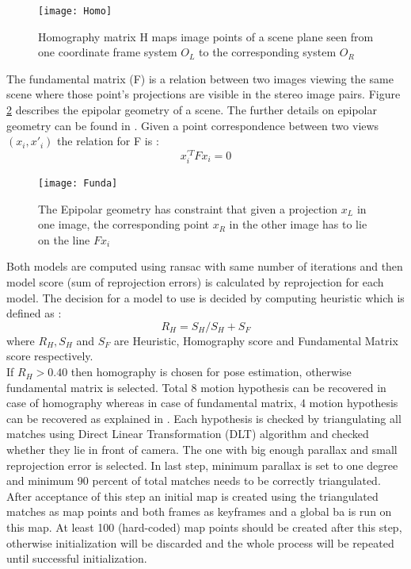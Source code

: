 \newline
\begin{figure}[H]
	\centering
	\texttt{[image: Homo]}
	\caption{Homography matrix H maps image points of a scene plane seen from one coordinate frame system $ O_{L} $ to the corresponding system $ O_{R} $ \cite{multiview}}
	\label{fig:h}
\end{figure}
\noindent The fundamental matrix (F) is a relation between two images viewing the same scene where those point’s projections are visible in the stereo image pairs. Figure \ref{fig:F} describes the epipolar geometry of a scene. The further details on epipolar geometry can be found in \cite{multiview_geometry}. Given a point correspondence between two views 
$ (x_{i} , x{'}_{i}) $ the relation for F is : 
\begin{equation*}
x^{'T}_{i}Fx_{i} = 0    
\end{equation*}    
\newline
\begin{figure}[H]
	\centering
	\texttt{[image: Funda]}
	\caption{The Epipolar geometry has constraint that given a projection $ x_{L} $ in one image, the corresponding point $ x_{R} $ in the other image has to lie on the line $ Fx_{i} $ \cite{multiview}}
	\label{fig:F}
\end{figure}
\noindent Both models are computed using \acrshort{ransac} with same number of iterations and then model score (sum of reprojection errors) is calculated by reprojection for each model.
The decision for a model to use is decided by computing heuristic which is defined as : 
\begin{equation*}
R_{H} = S_{H} / {S_{H} + S_{F}}  
\end{equation*}  
where $ R_{H}, S_{H}$  and $ S_{F} $ are Heuristic, Homography score and Fundamental Matrix score respectively. \\
\linebreak
If $ R_{H}  > 0.40 $ then homography is chosen for pose estimation, otherwise fundamental matrix is selected. Total 8 motion hypothesis can be recovered in case of homography whereas in case of fundamental matrix, 4 motion hypothesis can be recovered as explained in \cite{multiview_geometry}. Each hypothesis is checked by triangulating all matches using Direct Linear Transformation (DLT) algorithm \cite{multiview_geometry} and checked whether they lie in front of camera. The one with big enough parallax and small reprojection error is selected. In last step, minimum parallax is set to one degree and minimum 90 percent of total matches needs to be correctly triangulated. \\
\linebreak
After acceptance of this step an initial map is created using the triangulated matches as map points and both frames as keyframes and a global \acrshort{ba} is run on this map. At least 100 (hard-coded) map points should be created after this step, otherwise initialization will be discarded and the whole process will be repeated until successful initialization. 
